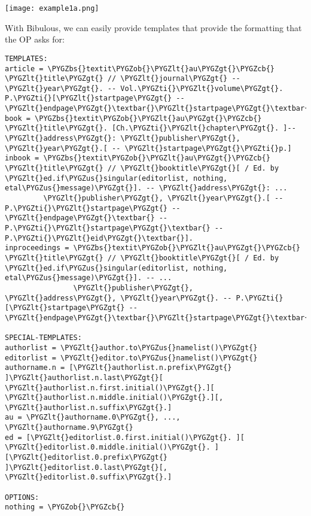 \documentclass[letterpaper,10pt,english]{sphinxmanual}
\def\PYGZbs{\char`\\}
\def\PYGZus{\char`\_}
\def\PYGZob{\char`\{}
\def\PYGZcb{\char`\}}
\def\PYGZlt{\char`\<}
\def\PYGZgt{\char`\>}
\def\PYGZti{\char`\~}
\begin{document}
\texttt{[image: example1a.png]}

With Bibulous, we can easily provide templates that provide the formatting that the OP asks for:

\begin{Verbatim}[commandchars=\\\{\}]
TEMPLATES:
article = \PYGZbs{}textit\PYGZob{}\PYGZlt{}au\PYGZgt{}\PYGZcb{} \PYGZlt{}title\PYGZgt{} // \PYGZlt{}journal\PYGZgt{} -- \PYGZlt{}year\PYGZgt{}. -- Vol.\PYGZti{}\PYGZlt{}volume\PYGZgt{}. P.\PYGZti{}[\PYGZlt{}startpage\PYGZgt{} -- \PYGZlt{}endpage\PYGZgt{}\textbar{}\PYGZlt{}startpage\PYGZgt{}\textbar{}\PYGZlt{}eid\PYGZgt{}\textbar{}].
book = \PYGZbs{}textit\PYGZob{}\PYGZlt{}au\PYGZgt{}\PYGZcb{} \PYGZlt{}title\PYGZgt{}. [Ch.\PYGZti{}\PYGZlt{}chapter\PYGZgt{}. ]-- \PYGZlt{}address\PYGZgt{}: \PYGZlt{}publisher\PYGZgt{}, \PYGZlt{}year\PYGZgt{}.[ -- \PYGZlt{}startpage\PYGZgt{}\PYGZti{}p.]
inbook = \PYGZbs{}textit\PYGZob{}\PYGZlt{}au\PYGZgt{}\PYGZcb{} \PYGZlt{}title\PYGZgt{} // \PYGZlt{}booktitle\PYGZgt{}[ / Ed. by \PYGZlt{}ed.if\PYGZus{}singular(editorlist, nothing, etal\PYGZus{}message)\PYGZgt{}]. -- \PYGZlt{}address\PYGZgt{}: ...
         \PYGZlt{}publisher\PYGZgt{}, \PYGZlt{}year\PYGZgt{}.[ -- P.\PYGZti{}\PYGZlt{}startpage\PYGZgt{} -- \PYGZlt{}endpage\PYGZgt{}\textbar{} -- P.\PYGZti{}\PYGZlt{}startpage\PYGZgt{}\textbar{} -- P.\PYGZti{}\PYGZlt{}eid\PYGZgt{}\textbar{}].
inproceedings = \PYGZbs{}textit\PYGZob{}\PYGZlt{}au\PYGZgt{}\PYGZcb{} \PYGZlt{}title\PYGZgt{} // \PYGZlt{}booktitle\PYGZgt{}[ / Ed. by \PYGZlt{}ed.if\PYGZus{}singular(editorlist, nothing, etal\PYGZus{}message)\PYGZgt{}]. -- ...
                \PYGZlt{}publisher\PYGZgt{}, \PYGZlt{}address\PYGZgt{}, \PYGZlt{}year\PYGZgt{}. -- P.\PYGZti{}[\PYGZlt{}startpage\PYGZgt{} -- \PYGZlt{}endpage\PYGZgt{}\textbar{}\PYGZlt{}startpage\PYGZgt{}\textbar{}\PYGZlt{}eid\PYGZgt{}\textbar{}].

SPECIAL-TEMPLATES:
authorlist = \PYGZlt{}author.to\PYGZus{}namelist()\PYGZgt{}
editorlist = \PYGZlt{}editor.to\PYGZus{}namelist()\PYGZgt{}
authorname.n = [\PYGZlt{}authorlist.n.prefix\PYGZgt{} ]\PYGZlt{}authorlist.n.last\PYGZgt{}[ \PYGZlt{}authorlist.n.first.initial()\PYGZgt{}.][ \PYGZlt{}authorlist.n.middle.initial()\PYGZgt{}.][,  \PYGZlt{}authorlist.n.suffix\PYGZgt{}.]
au = \PYGZlt{}authorname.0\PYGZgt{}, ..., \PYGZlt{}authorname.9\PYGZgt{}
ed = [\PYGZlt{}editorlist.0.first.initial()\PYGZgt{}. ][ \PYGZlt{}editorlist.0.middle.initial()\PYGZgt{}. ][\PYGZlt{}editorlist.0.prefix\PYGZgt{} ]\PYGZlt{}editorlist.0.last\PYGZgt{}[,  \PYGZlt{}editorlist.0.suffix\PYGZgt{}.]

OPTIONS:
nothing = \PYGZob{}\PYGZcb{}
\end{Verbatim}
\end{document}
